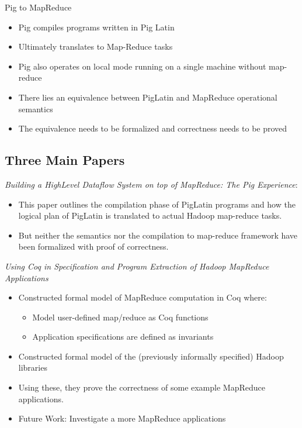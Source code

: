 \begin{frame}{Pig to MapReduce}
\begin{itemize}
	\item Pig compiles programs written in Pig Latin
	\item Ultimately translates to Map-Reduce tasks
	\item Pig also operates on local mode running on a single machine without
          map-reduce
	\item There lies an equivalence between PigLatin and MapReduce operational
          semantics
	\item The equivalence needs to be formalized and correctness needs to be
          proved
\end{itemize}
\end{frame}


\subsection{Three Main Papers}

\begin{frame}{\citet[VLDB][]{gates2009building}}
\emph{Building a HighLevel Dataflow System on top of MapReduce: The Pig
Experience}:
\begin{itemize}
	\item This paper outlines the compilation phase of PigLatin programs and how
          the logical plan of PigLatin is translated to actual Hadoop map-reduce
          tasks.
	\item But neither the semantics nor the compilation to map-reduce framework
          have been formalized with proof of correctness.
\end{itemize}
\end{frame}

\begin{frame}{\citet[SEFM]{ono2011using}}
\emph{Using Coq in Specification and Program Extraction of Hadoop MapReduce
Applications}
\begin{itemize}
    \item Constructed formal model of MapReduce computation in Coq where:
    \begin{itemize}
        \item Model user-defined map/reduce as Coq functions
        \item Application specifications are defined as invariants
    \end{itemize}
	\item Constructed formal model of the (previously informally specified)
          Hadoop libraries
	\item Using these, they prove the correctness of some example MapReduce
          applications.
    \item Future Work: Investigate a more MapReduce applications
\end{itemize}
\end{frame}

